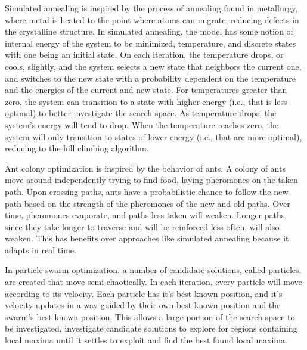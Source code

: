 \documentclass[12pt,dvipsnames]{report}
\begin{document}
Simulated annealing is inspired by the process of annealing found in metallurgy, where metal is heated to the point where atoms can migrate, reducing defects in the crystalline structure.  In simulated annealing, the model has some notion of internal energy of the system to be minimized, temperature, and discrete states with one being an initial state.  On each iteration, the temperature drops, or cools, slightly, and the system selects a new state that neighbors the current one, and switches to the new state with a probability dependent on the temperature and the energies of the current and new state.  For temperatures greater than zero, the system can transition to a state with higher energy (i.e., that is less optimal) to better investigate the search space.  As temperature drops, the system's energy will tend to drop.  When the temperature reaches zero, the system will only transition to states of lower energy (i.e., that are more optimal), reducing to the hill climbing algorithm.

Ant colony optimization is inspired by the behavior of ants.  A colony of ants move around independently trying to find food, laying pheromones on the taken path.  Upon crossing paths, ants have a probabilistic chance to follow the new path based on the strength of the pheromones of the new and old paths.  Over time, pheromones evaporate, and paths less taken will weaken.  Longer paths, since they take longer to traverse and will be reinforced less often, will also weaken.  This has benefits over approaches like simulated annealing because it adapts in real time.

In particle swarm optimization, a number of candidate solutions, called particles, are created that move semi-chaotically.  In each iteration, every particle will move according to its velocity.  Each particle has it's best known position, and it's velocity updates in a way guided by their own best known position and the swarm's best known position.  This allows a large portion of the search space to be investigated, investigate candidate solutions to explore for regions containing local maxima until it settles to exploit and find the best found local maxima.
\end{document}
